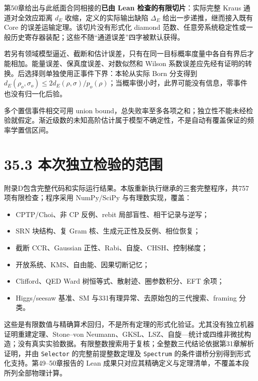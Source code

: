 \documentclass[
  11pt,
  oneside]{book}
\providecommand{\tightlist}{%
  \setlength{\itemsep}{0pt}\setlength{\parskip}{0pt}}
\begin{document}
第50章给出与此纸面合同相接的\textbf{已由 Lean 检查的有限切片}：实际完整
Kraus 通道对全效应距离 \(d_E\) 收缩，定义的实际输出缺陷 \(\Delta_E\)
给出一步递推，继而接入既有 Core 的误差运输定理。该切片没有形式化 diamond
范数、任意旁系统稳定性或一般历史寄存器装配；这些不随``通道误差''四字被默认获得。

若另有领域模型逼近、截断和估计误差，只有在同一目标概率度量中各自有界后才能相加。能量误差、保真度误差、对数似然和
Wilson
系数误差应先经有证明的转换。后选择则单独使用正事件下界：本轮从实际 Born
分支得到
\(d_E(\rho_o,\sigma_o)\le2d_E(\rho,\sigma)/p_o(\rho)\)；当概率很小时，此界可能没有信息，零事件也没有归一化后验。

多个置信事件相交可用 union
bound，总失败率至多各项之和；独立性不能未经检验就假定。渐近级数的未知高阶估计属于模型不确定性，不是自动有覆盖保证的频率学置信区间。

\hypertarget{ux672cux6b21ux72ecux7acbux68c0ux9a8cux7684ux8303ux56f4}{%
\section{35.3
本次独立检验的范围}\label{ux672cux6b21ux72ecux7acbux68c0ux9a8cux7684ux8303ux56f4}}

附录D包含完整代码和实际运行结果。本版重新执行继承的三套完整程序，共757项有限检查；程序采用
NumPy/SciPy 与有理数实现，覆盖：

\begin{itemize}
\tightlist
\item
  CPTP/Choi、非 CP 反例、rebit 局部盲性、相干记录与逆写；
\item
  SRN 块结构、复 Gram 核、生成元正性及反例、相位恢复；
\item
  截断 CCR、Gaussian 正性、Rabi、自旋、CHSH、控制梯度；
\item
  开放系统、KMS、自由能、因果切断记忆；
\item
  Clifford、QED Ward 树恒等式、散射迹、圈参数积分、EFT 余项；
\item
  Higgs/seesaw 基准、SM 与331有理异常、去原始包的三代搜索、framing
  分类。
\end{itemize}

这些是有限数值与精确算术回归，不是所有定理的形式化验证。尤其没有独立机器证明重建定理、Stone--von
Neumann、GKSL、LSZ、自旋---统计或四维非微扰构造；没有真实实验数据。有限整数搜索用于复核；全整数三代结论依据第31章解析证明，并由
\texttt{Selector} 的完整前提整数定理及 \texttt{Spectrum}
的条件谱桥分别得到形式化支持。第49--50章报告的 Lean
成果只对应其精确定义与定理清单，不覆盖本段所列全部物理计算。
\end{document}
